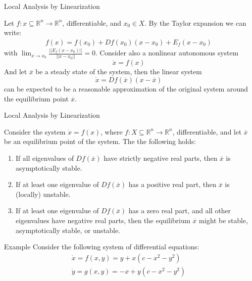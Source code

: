 \documentclass[aspectratio=169, handout]{beamer}
\begin{document}
\begin{frame}{Local Analysis by Linearization}

Let $f:x\subseteq\mathds{R}^n\rightarrow \mathds{R}^n$, differentiable, and $x_0\in X$. By the Taylor expansion we can write:
\begin{align*}
    f(x)=f(x_0)+Df(x_0)(x-x_0)+E_f(x-x_0)
\end{align*}
    with $\lim_{x\rightarrow x_0} \frac{||E_f(x-x_0)||}{||x-x_0||} = 0$. Consider also a nonlinear autonomous system \[\dot{x}=f(x)\]
    And let $\overline{x}$ be a steady state of the system, then the linear system \[\dot{x}=Df(\overline{x})(x-\overline{x})\] can be expected to be a reasonable approximation of the original system around the equilibrium point $\overline{x}$.
\end{frame}

\begin{frame}{Local Analysis by Linearization}
\begin{theorem}
    Consider the system $\dot{x}=f(x)$, where $f:X\subseteq\mathds{R}^n\rightarrow\mathds{R}^n$, differentiable, and let $\overline{x}$ be an equilibrium point of the system. The the following holds:
    \begin{enumerate}
        \item If all eigenvalues of $Df(\overline{x})$ have strictly negative real parts, then $\overline{x}$ is asymptotically stable.
        \item If at least one eigenvalue of $Df(\overline{x})$ has a positive real part, then $\overline{x}$ is (locally) unstable.
        \item If at least one eigenvalue of $Df(\overline{x})$ has a zero real part, and all other eigenvalues have negative real parts, then the equilibrium $\overline{x}$ might be stable, asymptotically stable, or unstable.
    \end{enumerate}
\end{theorem}
    
\end{frame}

\begin{frame}{Example}
    Consider the following system of differential equations:
    \begin{align}
        \dot{x}=f(x,y)=y+x(c-x^2-y^2)\label{ex1a}\\
        \dot{y}=g(x,y)=-x+y(c-x^2-y^2)\label{ex1b}
    \end{align}
\end{frame}
\end{document}
